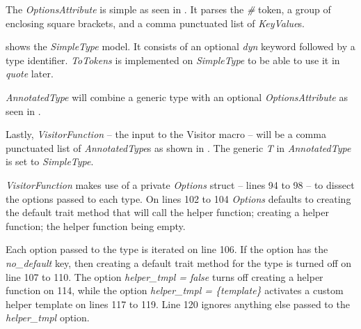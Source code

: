 The \textit{OptionsAttribute} is simple as seen in .
It parses the \textit{\#} token, a group of enclosing square brackets, and a comma punctuated list of \textit{KeyValue}s.


 shows the \textit{SimpleType} model.
It consists of an optional \textit{dyn} keyword followed by a type identifier.
\textit{ToTokens} is implemented on \textit{SimpleType} to be able to use it in \textit{quote} later.


\textit{AnnotatedType} will combine a generic type with an optional \textit{OptionsAttribute} as seen in .



Lastly, \textit{VisitorFunction} -- the input to the Visitor macro -- will be a comma punctuated list of \textit{AnnotatedType}s as shown in .
The generic \textit{T} in \textit{AnnotatedType} is set to \textit{SimpleType}.


\textit{VisitorFunction} makes use of a private \textit{Options} struct -- lines 94 to 98 -- to dissect the options passed to each type.
On lines 102 to 104 \textit{Options} defaults to creating the default trait method that will call the helper function; creating a helper function; the helper function being empty.

Each option passed to the type is iterated on line 106.
If the option has the \textit{no\_default} key, then creating a default trait method for the type is turned off on line 107 to 110.
The option \textit{helper\_tmpl = false} turns off creating a helper function on 114, while the option \textit{helper\_tmpl = \{template\}} activates a custom helper template on lines 117 to 119.
Line 120 ignores anything else passed to the \textit{helper\_tmpl} option.

